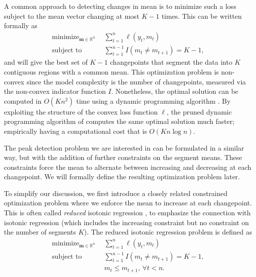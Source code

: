 \documentclass[aoas]{imsart}
\DeclareMathOperator*{\minimize}{minimize}
\newcommand{\RR}{\mathbb R}
\begin{document}
A common approach to detecting changes in mean is to minimize such a loss 
subject to the mean vector changing at most $K-1$ times. This can be written formally
as
\begin{align}
  \label{eq:optimal_segment_neighborhood}
  \minimize_{\mathbf m\in\RR^n} &\ \ 
  \sum_{t=1}^n \ell(y_t, m_t)\\
  \text{subject to} &\ \  \sum_{t=1}^{n-1} I(m_t \neq m_{t+1}) = K-1,
  \nonumber
\end{align}
and will give the best set of $K-1$ changepoints that segment the data into $K$
contiguous regions with a common mean.  This optimization problem is non-convex since the model complexity is
the number of changepoints, measured via the non-convex indicator
function $I$. Nonetheless, the optimal solution can be computed in
$O(K n^2)$ time using a dynamic programming algorithm
\citep{segment-neighborhood}. By exploiting the structure of the
convex loss function $\ell$, the pruned dynamic programming algorithm
of \citet{pruned-dp} computes the same optimal solution much faster; empirically
having a computational cost that is
$O(K n \log n)$.

The peak detection problem we are interested in can be formulated in a similar way, but with
the addition of further constraints on the segment means. These constraints force the mean
to alternate between increasing and decreasing at each changepoint. We will formally define the resulting
optimization problem later.

To simplify our discussion, we first introduce a closely related
constrained optimization problem where we enforce the mean to increase
at each changepoint. This is often called \emph{reduced} isotonic regression
\citep{reduced-monotonic-regression}, to emphasize the connection with
isotonic regression (which includes the increasing
constraint but no constraint on the number of segments $K$). The
reduced isotonic regression problem is defined as
\begin{align}
  \label{eq:reduced}
  \minimize_{\mathbf m\in\RR^n} &\ \ 
  \sum_{t=1}^n \ell(y_t, m_t)\\
  \text{subject to} &\ \  \sum_{t=1}^{n-1} I(m_t \neq m_{t+1}) = K-1,
  \nonumber\\
  &\ \  m_t \leq m_{t+1},\, \forall t<n.
  \nonumber 
\end{align}
\end{document}
